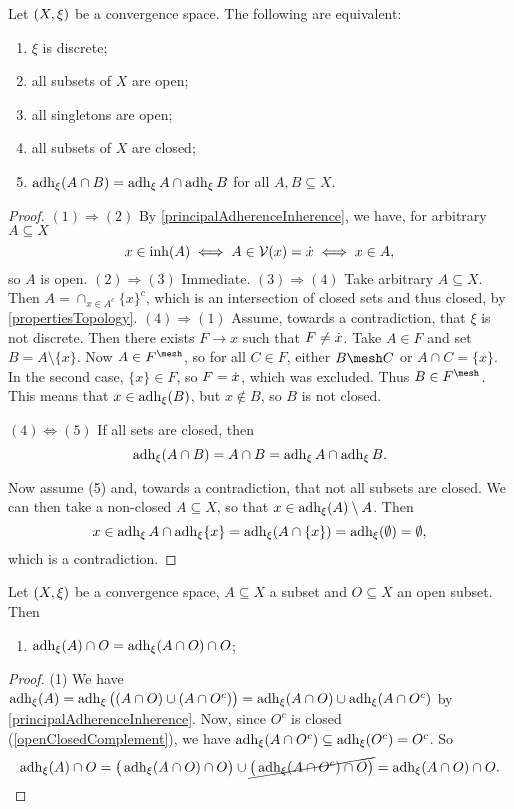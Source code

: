 \begin{proposition} \label{discreteTopologyCharacterisation}
Let $\sSet{X,\xi}$ be a convergence space. The following are equivalent:
\begin{enumerate}
\item $\xi$ is discrete;
\item all subsets of $X$ are open;
\item all singletons are open;
\item all subsets of $X$ are closed;
\item $\operatorname{adh}_\xi(A\cap B) = \operatorname{adh}_\xi A \cap \operatorname{adh}_\xi B$ for all $A,B\subseteq X$.
\end{enumerate}
\end{proposition}
\begin{proof}
$(1) \Rightarrow (2)$ By \ref{principalAdherenceInherence}, we have, for arbitrary $A\subseteq X$
\[ x\in \operatorname{inh}(A) \iff A\in \operatorname{\mathcal{V}}(x) = \dot{x} \iff x\in A, \]
so $A$ is open.
$(2) \Rightarrow (3)$ Immediate.
$(3) \Rightarrow (4)$ Take arbitrary $A\subseteq X$. Then $A = \cap_{x\in A^c}\{x\}^c$, which is an intersection of closed sets and thus closed, by \ref{propertiesTopology}.
$(4) \Rightarrow (1)$ Assume, towards a contradiction, that $\xi$ is not discrete. Then there exists $F\to x$ such that $F \neq \dot{x}$. Take $A\in F$ and set $B = A\setminus\{x\}$. Now $A\in F^\mesh$, so for all $C\in F$, either $B\mesh C$ or $A\cap C = \{x\}$. In the second case, $\{x\}\in F$, so $F = \dot{x}$, which was excluded. Thus $B\in F^\mesh$. This means that $x\in \operatorname{adh}_\xi(B)$, but $x\notin B$, so $B$ is not closed. 

$(4) \Leftrightarrow (5)$ If all sets are closed, then
\[ \operatorname{adh}_\xi(A\cap B) = A\cap B = \operatorname{adh}_\xi A \cap \operatorname{adh}_\xi B. \]

Now assume (5) and, towards a contradiction, that not all subsets are closed. We can then take a non-closed $A\subseteq X$, so that $x\in \operatorname{adh}_\xi(A)\setminus A$. Then
\[ x\in \operatorname{adh}_\xi A \cap \operatorname{adh}_\xi \{x\} = \operatorname{adh}_\xi(A\cap\{x\}) = \operatorname{adh}_\xi(\emptyset) = \emptyset, \]
which is a contradiction.
\end{proof}

\begin{lemma} \label{openClosedSetLemma}
Let $\sSet{X,\xi}$ be a convergence space, $A\subseteq X$ a subset and $O\subseteq X$ an open subset. Then
\begin{enumerate}
\item $\operatorname{adh}_\xi(A)\cap O = \operatorname{adh}_\xi(A\cap O)\cap O$;
\end{enumerate}
\end{lemma}
\begin{proof}
(1) We have $\operatorname{adh}_\xi(A) = \operatorname{adh}_\xi\big((A\cap O) \cup (A\cap O^c)\big) = \operatorname{adh}_\xi(A\cap O) \cup \operatorname{adh}_\xi(A\cap O^c)$ by \ref{principalAdherenceInherence}. Now, since $O^c$ is closed (\ref{openClosedComplement}), we have $\operatorname{adh}_\xi(A\cap O^c) \subseteq \operatorname{adh}_\xi(O^c) = O^c$. So
\[ \operatorname{adh}_\xi(A)\cap O = \big(\operatorname{adh}_\xi(A\cap O)\cap O\big) \cup \cancel{\big(\operatorname{adh}_\xi(A\cap O^c)\cap O\big)} = \operatorname{adh}_\xi(A\cap O)\cap O. \]
\end{proof}

